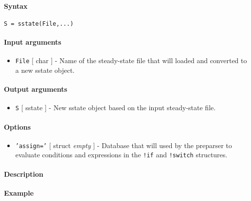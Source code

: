 


	\paragraph{Syntax}

\begin{verbatim}
S = sstate(File,...)
\end{verbatim}

\paragraph{Input arguments}

\begin{itemize}
\itemsep1pt\parskip0pt
\item
  \texttt{File} {[} char {]} - Name of the steady-state file that will
  loaded and converted to a new sstate object.
\end{itemize}

\paragraph{Output arguments}

\begin{itemize}
\itemsep1pt\parskip0pt
\item
  \texttt{S} {[} sstate {]} - New sstate object based on the input
  steady-state file.
\end{itemize}

\paragraph{Options}

\begin{itemize}
\itemsep1pt\parskip0pt
\item
  \texttt{'assign='} {[} struct \textbar{} \emph{empty} {]} - Database
  that will used by the preparser to evaluate conditions and expressions
  in the \texttt{!if} and \texttt{!switch} structures.
\end{itemize}

\paragraph{Description}

\paragraph{Example}


